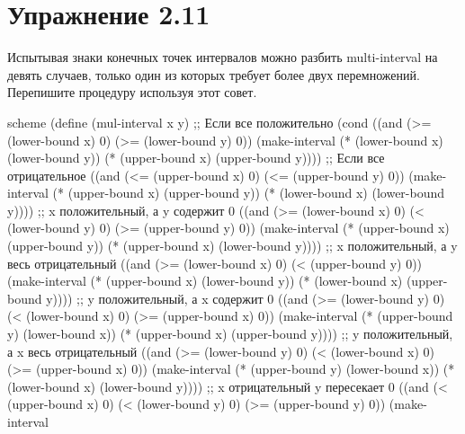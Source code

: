 \chapter{Упражнение 2.11}

Испытывая знаки конечных точек интервалов можно разбить multi-interval на девять случаев, только один из которых требует более двух перемножений. Перепишите процедуру используя этот совет.


\begin{codelisting}{scheme}
(define (mul-interval x y)
  ;; Если все положительно
  (cond ((and (>= (lower-bound x) 0) (>= (lower-bound y) 0)) (make-interval
                                                              (* (lower-bound x) (lower-bound y))
                                                              (* (upper-bound x) (upper-bound y))))
        ;; Если все отрицательное
        ((and (<= (upper-bound x) 0) (<= (upper-bound y) 0)) (make-interval
                                                              (* (upper-bound x) (upper-bound y))
                                                              (* (lower-bound x) (lower-bound y))))
        ;; x положительный, а y содержит 0
        ((and (>= (lower-bound x) 0) (< (lower-bound y) 0) (>= (upper-bound y) 0)) (make-interval
                                                                                    (* (upper-bound x) (upper-bound y))
                                                                                    (* (upper-bound x) (lower-bound y))))
        ;; x положительный, а y весь отрицательный
        ((and (>= (lower-bound x) 0) (< (upper-bound y) 0)) (make-interval
                                                             (* (upper-bound x) (lower-bound y))
                                                             (* (lower-bound x) (upper-bound y))))
        ;; y положительный, а x содержит 0
        ((and (>= (lower-bound y) 0) (< (lower-bound x) 0) (>= (upper-bound x) 0)) (make-interval
                                                             (* (upper-bound y) (lower-bound x))
                                                             (* (upper-bound x) (upper-bound y))))
        ;; y положительный, а x весь отрицательный
        ((and (>= (lower-bound y) 0) (< (lower-bound x) 0) (>= (upper-bound x) 0)) (make-interval
                                                             (* (upper-bound y) (lower-bound x))
                                                             (* (lower-bound x) (lower-bound y))))
        ;; x отрицательный y пересекает 0
        ((and (< (upper-bound x) 0) (< (lower-bound y) 0) (>= (upper-bound y) 0)) (make-interval

\end{codelisting}
